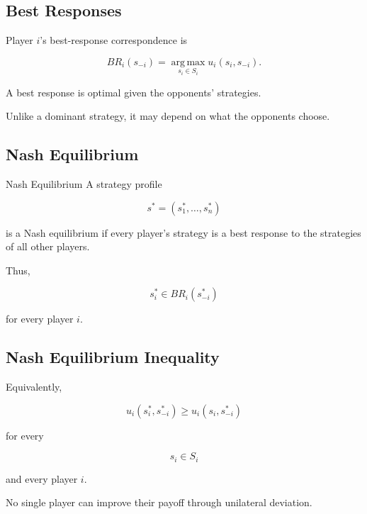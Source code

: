 \subsection{Best Responses}
\label{subsec:best-responses}

Player \(i\)'s best-response correspondence is

\[
\boxed{
BR_i(s_{-i})
=
\operatorname*{arg\,max}_{s_i\in S_i}
u_i(s_i,s_{-i}).
}
\]

A best response is optimal given the opponents' strategies.

Unlike a dominant strategy, it may depend on what the opponents choose.

\subsection{Nash Equilibrium}
\label{subsec:nash-equilibrium}

\begin{definitionbox}{Nash Equilibrium}
A strategy profile

\[
s^*
=
(s_1^*,\ldots,s_n^*)
\]

is a Nash equilibrium if every player's strategy is a best response to the
strategies of all other players.
\end{definitionbox}

Thus,

\[
\boxed{
s_i^*
\in
BR_i(s_{-i}^*)
}
\]

for every player \(i\).

\subsection{Nash Equilibrium Inequality}
\label{subsec:nash-equilibrium-inequality}

Equivalently,

\[
\boxed{
u_i(s_i^*,s_{-i}^*)
\geq
u_i(s_i,s_{-i}^*)
}
\]

for every

\[
s_i\in S_i
\]

and every player \(i\).

No single player can improve their payoff through unilateral deviation.

